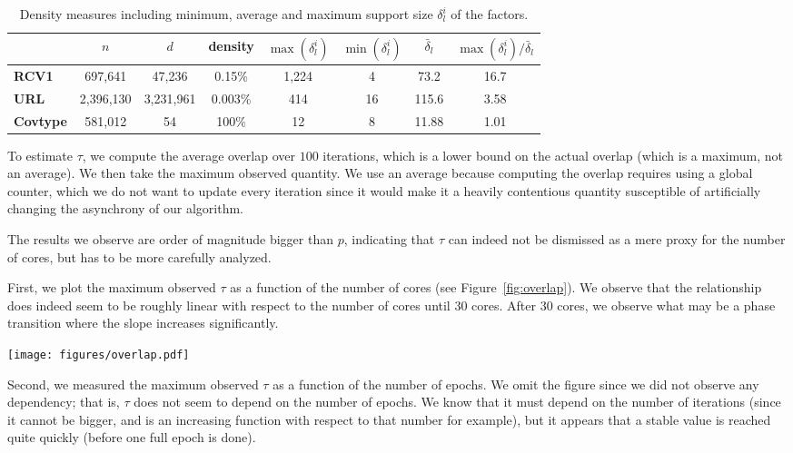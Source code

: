 \documentclass[twoside]{article}
\newcommand{\overlap}{\tau}
\newcommand{\ASAGA}{\textsc{Asaga}}
\newcommand{\Hogwild}{\textsc{Hogwild}}
\begin{document}
\begin{table}[ht]
\caption{Density measures including minimum, average and maximum support size $\delta_l^i$ of the factors.}
\centering
\label{dataset-table2}
\begin{tabular}{lccccccc} 
\toprule
{} & $n$ & $d$ & density & $\max(\delta_l^i)$ & $\min(\delta_l^i)$ & $\bar \delta_l$ & $\max(\delta_l^i) / \bar \delta_l$\\
\midrule
{\bf RCV1} & \hfill 697,641 & \hfill 47,236 & \hfill 0.15\% & \hfill 1,224 & \hfill 4 & \hfill 73.2 & \hfill 16.7\\ 
{\bf URL} & \hfill 2,396,130 & \hfill 3,231,961 & \hfill 0.003\% & \hfill 414 & \hfill 16 & \hfill 115.6 & \hfill 3.58 \\
{\bf Covtype} & \hfill 581,012 & \hfill 54 & \hfill 100\% & \hfill 12 & \hfill 8 & \hfill 11.88 & \hfill 1.01 \\
\bottomrule
\end{tabular}
\label{table:1}
\end{table}

To estimate $\overlap$, we compute the average overlap over $100$ iterations, which is a lower bound on the actual overlap (which is a maximum, not an average). 
We then take the maximum observed quantity.
We use an average because computing the overlap requires using a global counter, which we do not want to update every iteration since it would make it a heavily contentious quantity susceptible of artificially changing the asynchrony of our algorithm.

The results we observe are order of magnitude bigger than $p$, indicating that $\overlap$ can indeed not be dismissed as a mere proxy for the number of cores, but has to be more carefully analyzed.

First, we plot the maximum observed $\overlap$ as a function of the number of cores (see Figure~\ref{fig:overlap}).
We observe that the relationship does indeed seem to be roughly linear with respect to the number of cores until 30 cores.
After 30 cores, we observe what may be a phase transition where the slope increases significantly.

\begin{figure*}
\texttt{[image: figures/overlap.pdf]}
\caption{{\bf Overlap}. 
Overlap as a function of the number of cores for both \ASAGA\ and \Hogwild\ on all three datasets.}\label{fig:overlap}
\end{figure*} 

Second, we measured the maximum observed $\overlap$ as a function of the number of epochs.
We omit the figure since we did not observe any dependency; that is, $\overlap$ does not seem to depend on the number of epochs.
We know that it must depend on the number of iterations (since it cannot be bigger, and is an increasing function with respect to that number for example), but it appears that a stable value is reached quite quickly (before one full epoch is done).
\end{document}

